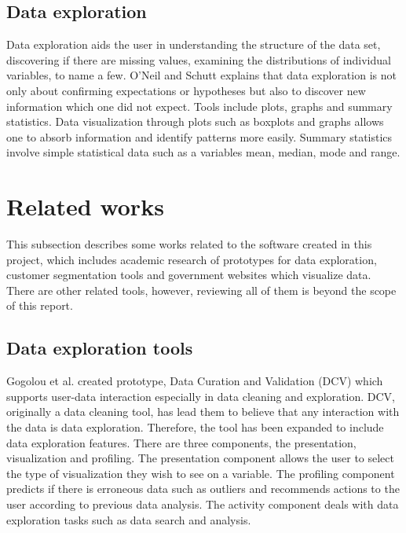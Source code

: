 \subsection{Data exploration}
Data exploration aids the user in understanding the structure of the data set, discovering if there are missing values, examining the distributions of individual variables, to name a few. O'Neil and Schutt \cite{oneilschutt2014} explains that data exploration is not only about confirming expectations or hypotheses but also to discover new information which one did not expect. Tools include plots, graphs and summary statistics. Data visualization through plots such as boxplots and graphs allows one to absorb information and identify patterns more easily. Summary statistics involve simple statistical data such as a variable\textsc{}s mean, median, mode and range.

\section{Related works}

This subsection describes some works related to the software created in this project, which includes academic research of prototypes for data exploration, customer segmentation tools and government websites which visualize data. There are other related tools, however, reviewing all of them is beyond the scope of this report.
\par

\subsection{Data exploration tools}

Gogolou et al. \cite{gogoloudata2016} created prototype, Data Curation and Validation (DCV) which supports user-data interaction especially in data cleaning and exploration. DCV, originally a data cleaning tool, has lead them to believe that any interaction with the data is data exploration. Therefore, the tool has been expanded to include data exploration features. There are three components, the presentation, visualization and profiling. The presentation component allows the user to select the type of visualization they wish to see on a variable. The profiling component predicts if there is erroneous data such as outliers and recommends actions to the user according to previous data analysis. The activity component deals with data exploration tasks such as data search and analysis.\par

